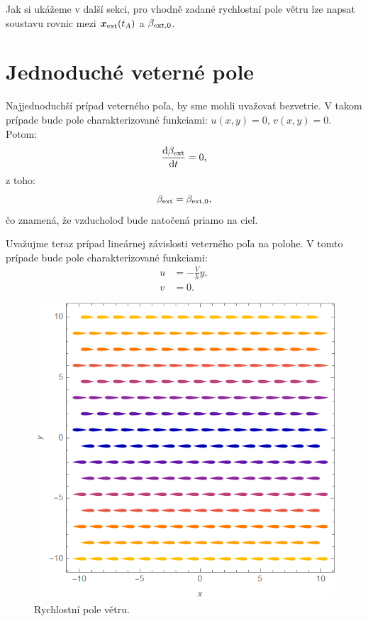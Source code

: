 \documentclass[reqno, a4paper]{amsart}
\numberwithin{equation}{section}
\begin{document}
Jak si ukážeme v další sekci, pro vhodně zadané rychlostní pole větru lze napsat soustavu rovnic mezi $\bm{x}_{\mathrm{ext}}(t_{A})$ a $ \beta_{\mathrm{ext}, 0}$.

\section{Jednoduché veterné pole}
\label{sec:JVP}
Najjednoduchší prípad veterného poľa, by sme mohli uvažovať bezvetrie. V takom prípade bude pole charakterizované funkciami: $u(x,y)=0$, $v(x,y)=0$. Potom:
\begin{align}
\frac{\mathrm{d} {\beta_{\mathrm{ext}}}}{\mathrm{d} {t}} = 0,
\end{align}
z toho:
\begin{align}
\beta_{\mathrm{ext}} =\beta_{\mathrm{ext},0},
\end{align}
čo znamená, že vzducholoď bude natočená priamo na cieľ.

Uvažujme teraz prípad lineárnej závislosti veterného poľa na polohe. V tomto prípade bude pole charakterizované funkciami:
\begin{align}
u &= -\frac{V}{h}y ,\\
v &= 0.
\end{align}

\begin{figure}
\includegraphics[scale=0.7]{figures/Graf.png}
\caption{Rychlostní pole větru.}
\label{pole}
\end{figure}
\end{document}
